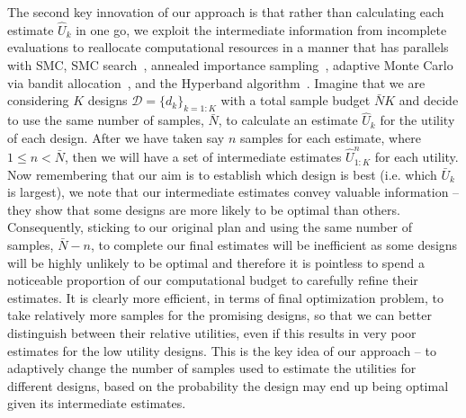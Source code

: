 The second key innovation of our approach is that rather than calculating each estimate $\hat{U}_k$ in one go, we
exploit the intermediate information from incomplete evaluations to reallocate computational
resources in a manner that has parallels with SMC, SMC search~\citep{amzal2006bayesian}, annealed
importance sampling~\citep{neal2001annealed}, adaptive Monte Carlo via bandit 
allocation~\citep{neufeld2014adaptive}, and the Hyperband algorithm~\citep{li2016hyperband}.
Imagine that we are considering $K$ designs $\mathcal{D} = \{d_k\}_{k=1:K}$ with a total sample budget $\bar{N}K$
and decide to use the same number of samples, $\bar{N}$, to calculate an estimate $\hat{U}_{k}$ for the 
utility of each design.  
After we have taken say $n$ samples
for each estimate, where $1\le n<\bar{N}$, then we will have a set of intermediate estimates $\hat{U}_{1:K}^n$ for
each utility.  Now remembering that our aim is to establish which design is best (i.e. which $\bar{U}_k$ is largest),
we note that our intermediate estimates convey valuable information -- they show that some designs are more
likely to be optimal than others.
Consequently, sticking to our original plan and using the same number of samples, $\bar{N}-n$, 
to complete our final estimates will
be inefficient as some designs will be highly unlikely to be optimal and therefore it is pointless to
spend a noticeable proportion of our computational budget to carefully refine their estimates.  It is clearly 
more efficient, in terms
of final optimization problem, to take relatively more samples for the promising designs, so that we can better 
distinguish between their relative utilities, even if this results in very poor estimates for the low utility
designs.  This is the key idea of our approach -- to adaptively change the number of samples used to estimate
the utilities for different designs, based on the probability the design may end up being optimal given its
intermediate estimates.

